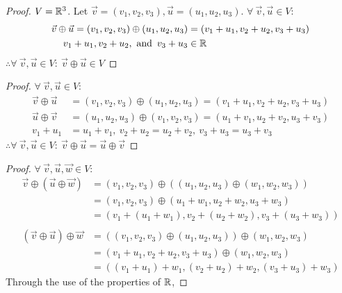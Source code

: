 \begin{enumerate}
  \begin{proof}
    $V = \mathbb{R}^3$. Let $\vec{v}=(v_1,v_2,v_3),\vec{u}=(u_1,u_2,u_3)$. $\forall~\vec{v},\vec{u} \in V$:
    \begin{align*}
      \vec{v} \oplus \vec{u} = (v_1,v_2,v_3) \oplus (u_1,u_2,u_3) & = (v_1+u_1,v_2+u_2,v_3+u_3) \\
      v_1+u_1,v_2+u_2, \operatorname{~\text{and}~} v_3+u_3                              & \in \mathbb{R}
    \end{align*}
    $\therefore \forall~\vec{v},\vec{u} \in V:~\vec{v} \oplus \vec{u} \in V$
  \end{proof}
  \begin{proof}
    $\forall~\vec{v},\vec{u} \in V$:
    \begin{align*}
      \vec{v} \oplus \vec{u} & = (v_1,v_2,v_3) \oplus (u_1,u_2,u_3) = (v_1+u_1,v_2+u_2,v_3+u_3) \\
      \vec{u} \oplus \vec{v} & = (u_1,u_2,u_3) \oplus (v_1,v_2,v_3) = (u_1+v_1,u_2+v_2,u_3+v_3) \\
      v_1+u_1                & = u_1+v_1,~v_2+u_2 = u_2+v_2,~v_3+u_3 = u_3+v_3
    \end{align*}
    $\therefore \forall~\vec{v},\vec{u} \in V:~\vec{v} \oplus \vec{u} = \vec{u} \oplus \vec{v}$
  \end{proof}
  \begin{proof}
    $\forall~\vec{v},\vec{u},\vec{w} \in V$:
    \begin{align*}
      \vec{v} \oplus (\vec{u} \oplus \vec{w}) & = (v_1,v_2,v_3) \oplus ((u_1,u_2,u_3) \oplus (w_1,w_2,w_3)) \\
                                              & = (v_1,v_2,v_3) \oplus (u_1+w_1,u_2+w_2,u_3+w_3)            \\
                                              & = (v_1+(u_1+w_1),v_2+(u_2+w_2),v_3+(u_3+w_3))               \\ \\
      (\vec{v} \oplus \vec{u}) \oplus \vec{w} & = ((v_1,v_2,v_3) \oplus (u_1,u_2,u_3)) \oplus (w_1,w_2,w_3) \\
                                              & = (v_1+u_1,v_2+u_2,v_3+u_3) \oplus (w_1,w_2,w_3)            \\
                                              & = ((v_1+u_1)+w_1,(v_2+u_2)+w_2,(v_3+u_3)+w_3)
    \end{align*}
    Through the use of the properties of $\mathbb{R}$,

\end{proof}
\end{enumerate}
